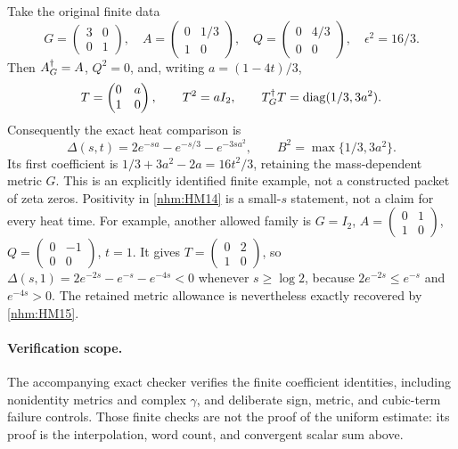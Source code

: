 \documentclass[11pt]{article}
\begin{document}
Take the original finite data
\begin{equation}
 G=\begin{pmatrix}3&0\\0&1\end{pmatrix},\quad
 A=\begin{pmatrix}0&1/3\\1&0\end{pmatrix},\quad
 Q=\begin{pmatrix}0&4/3\\0&0\end{pmatrix},\quad
 \epsilon^2=16/3.
 \tag{HM18}\label{nhm:HM18}
\end{equation}
Then \(A^\dagger_G=A\), \(Q^2=0\), and, writing \(a=(1-4t)/3\),
\[
 T=\begin{pmatrix}0&a\\1&0\end{pmatrix},\qquad
 T^2=aI_2,\qquad T^\dagger_G T=\operatorname{diag}(1/3,3a^2).
\]
Consequently the exact heat comparison is
\begin{equation}
 \Delta(s,t)=2e^{-sa}-e^{-s/3}-e^{-3sa^2},\qquad
 B^2=\max\{1/3,3a^2\}.
 \tag{HM19}\label{nhm:HM19}
\end{equation}
Its first coefficient is
\(1/3+3a^2-2a=16t^2/3\), retaining the mass-dependent metric \(G\).
This is an explicitly identified finite example, not a constructed packet
of zeta zeros. Positivity in \eqref{nhm:HM14} is a small-\(s\) statement, not
a claim for every heat time. For example, another allowed family is
\(G=I_2\), \(A=\left(\begin{smallmatrix}0&1\\1&0\end{smallmatrix}\right)\),
\(Q=\left(\begin{smallmatrix}0&-1\\0&0\end{smallmatrix}\right)\), \(t=1\).
It gives \(T=\left(\begin{smallmatrix}0&2\\1&0\end{smallmatrix}\right)\),
so \(\Delta(s,1)=2e^{-2s}-e^{-s}-e^{-4s}<0\) whenever \(s\ge\log 2\),
because \(2e^{-2s}\le e^{-s}\) and \(e^{-4s}>0\).
The retained metric allowance is nevertheless exactly recovered by
\eqref{nhm:HM15}.

\paragraph{Verification scope.}
The accompanying exact checker verifies the finite coefficient identities,
including nonidentity metrics and complex \(\gamma\), and deliberate
sign, metric, and cubic-term failure controls. Those finite checks are
not the proof of the uniform estimate: its proof is the interpolation,
word count, and convergent scalar sum above.
\end{document}

